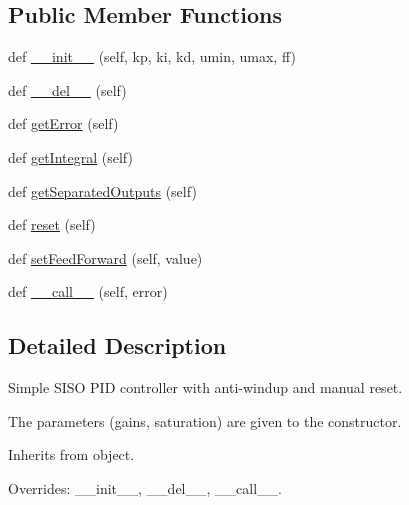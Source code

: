 \subsection*{Public Member Functions}
\begin{DoxyCompactItemize}
\item 
def \mbox{\hyperlink{classwindshape_1_1drone_1_1control_1_1_p_i_d_controller_1_1_p_i_d_controller_ad9a8dd923ba3d6fc00c55607acb008e3}{\+\_\+\+\_\+init\+\_\+\+\_\+}} (self, kp, ki, kd, umin, umax, ff)
\item 
def \mbox{\hyperlink{classwindshape_1_1drone_1_1control_1_1_p_i_d_controller_1_1_p_i_d_controller_a6f26110b94653fb4b21fb5962699caa1}{\+\_\+\+\_\+del\+\_\+\+\_\+}} (self)
\item 
def \mbox{\hyperlink{classwindshape_1_1drone_1_1control_1_1_p_i_d_controller_1_1_p_i_d_controller_a558de8f7c8d2f86ad2cfe333547bfe4f}{get\+Error}} (self)
\item 
def \mbox{\hyperlink{classwindshape_1_1drone_1_1control_1_1_p_i_d_controller_1_1_p_i_d_controller_a9a2fa18ceb6e0dfa2628a7d9ec8c6b00}{get\+Integral}} (self)
\item 
def \mbox{\hyperlink{classwindshape_1_1drone_1_1control_1_1_p_i_d_controller_1_1_p_i_d_controller_a66c09e31abe344dd6d977aa7ea67426c}{get\+Separated\+Outputs}} (self)
\item 
def \mbox{\hyperlink{classwindshape_1_1drone_1_1control_1_1_p_i_d_controller_1_1_p_i_d_controller_a9dc623e815f70dbffaf8de91d2071dd3}{reset}} (self)
\item 
def \mbox{\hyperlink{classwindshape_1_1drone_1_1control_1_1_p_i_d_controller_1_1_p_i_d_controller_a8ca7fc46dff37bdf5b88ceb6683d0e9e}{set\+Feed\+Forward}} (self, value)
\item 
def \mbox{\hyperlink{classwindshape_1_1drone_1_1control_1_1_p_i_d_controller_1_1_p_i_d_controller_a932a9bc5936376c1da6f9df14f27f215}{\+\_\+\+\_\+call\+\_\+\+\_\+}} (self, error)
\end{DoxyCompactItemize}


\subsection{Detailed Description}
\begin{DoxyVerb}Simple SISO PID controller with anti-windup and manual reset.

The parameters (gains, saturation) are given to the constructor.

Inherits from object.

Overrides: __init__, __del__, __call__.
\end{DoxyVerb}
 

